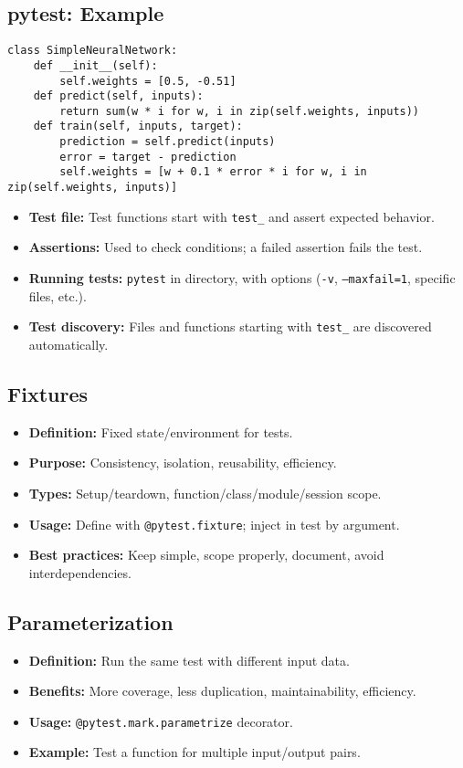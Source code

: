 \documentclass[11pt,a4paper]{article}
\begin{document}
\subsection*{pytest: Example}
\begin{verbatim}
class SimpleNeuralNetwork:
    def __init__(self):
        self.weights = [0.5, -0.51]
    def predict(self, inputs):
        return sum(w * i for w, i in zip(self.weights, inputs))
    def train(self, inputs, target):
        prediction = self.predict(inputs)
        error = target - prediction
        self.weights = [w + 0.1 * error * i for w, i in zip(self.weights, inputs)]
\end{verbatim}
\begin{itemize}
    \item \textbf{Test file:} Test functions start with \texttt{test\_} and assert expected behavior.
    \item \textbf{Assertions:} Used to check conditions; a failed assertion fails the test.
    \item \textbf{Running tests:} \texttt{pytest} in directory, with options (\texttt{-v}, \texttt{--maxfail=1}, specific files, etc.).
    \item \textbf{Test discovery:} Files and functions starting with \texttt{test\_} are discovered automatically.
\end{itemize}

\subsection*{Fixtures}
\begin{itemize}
    \item \textbf{Definition:} Fixed state/environment for tests.
    \item \textbf{Purpose:} Consistency, isolation, reusability, efficiency.
    \item \textbf{Types:} Setup/teardown, function/class/module/session scope.
    \item \textbf{Usage:} Define with \texttt{@pytest.fixture}; inject in test by argument.
    \item \textbf{Best practices:} Keep simple, scope properly, document, avoid interdependencies.
\end{itemize}

\subsection*{Parameterization}
\begin{itemize}
    \item \textbf{Definition:} Run the same test with different input data.
    \item \textbf{Benefits:} More coverage, less duplication, maintainability, efficiency.
    \item \textbf{Usage:} \texttt{@pytest.mark.parametrize} decorator.
    \item \textbf{Example:} Test a function for multiple input/output pairs.
\end{itemize}
\end{document}
